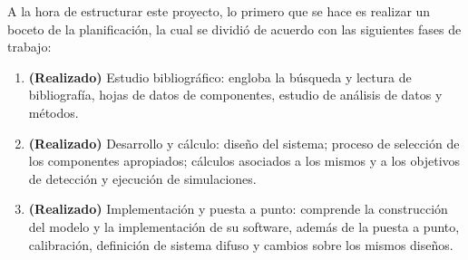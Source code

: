 A la hora de estructurar este proyecto, lo primero que se hace es realizar un boceto de la planificación, la cual se dividió de acuerdo con las siguientes fases de trabajo:\\

\begin{enumerate}
	\item \textbf{(Realizado)} Estudio bibliográfico: engloba la búsqueda y lectura de bibliografía, hojas de datos de componentes, estudio de análisis de datos y métodos.\\
	
	\item \textbf{(Realizado)} Desarrollo y cálculo: diseño del sistema; proceso de selección de los componentes apropiados; cálculos asociados a los mismos y a los objetivos de detección y ejecución de simulaciones.\\
	
	\item \textbf{(Realizado)} Implementación y puesta a punto: comprende la construcción del modelo y la implementación de su software, además de la puesta a punto, calibración, definición de sistema difuso y cambios sobre los mismos diseños.\\
\end{enumerate}